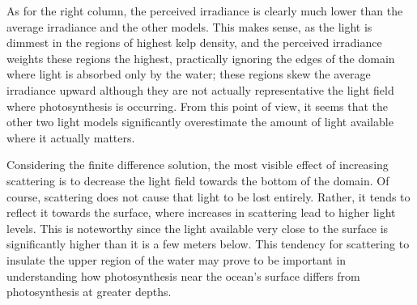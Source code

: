 \documentclass[ms,cpyr,lof,lot]{uathesis}
\providecommand{\DIFadd}[1]{{\protect\color{blue}\uwave{#1}}} %
\providecommand{\DIFaddbegin}{} %
\providecommand{\DIFaddend}{} %
\newcommand{\DIFaddincludegraphics}[2][]{{\color{blue}\fbox{\DIFOincludegraphics[#1]{#2}}}} %
\DeclareRobustCommand{\DIFaddbegin}{\DIFOaddbegin \let\includegraphics\DIFaddincludegraphics} %
\DeclareRobustCommand{\DIFaddend}{\DIFOaddend \let\includegraphics\DIFOincludegraphics} %
\begin{document}
As for the right column, the perceived irradiance is clearly much lower than the average irradiance and the other models.
This makes sense, as the light is dimmest in the regions of highest kelp density, and the perceived irradiance weights these regions the highest, practically ignoring the edges of the domain where light is absorbed only by the water; these regions skew the average irradiance upward although they are not actually representative \DIFaddbegin \DIFadd{of }\DIFaddend the light field where photosynthesis is occurring.
From this point of view, it seems that the other two light models significantly overestimate the amount of light available where it actually matters.

Considering the finite difference solution, the most visible effect of increasing scattering is to decrease the light field towards the bottom of the domain.
Of course, scattering does not cause that light to be lost entirely.
Rather, it tends to reflect it towards the surface, where increases in scattering lead to higher light levels.
This is noteworthy since the light available very close to the surface is significantly higher than it is a few meters below.
This tendency for scattering to insulate the upper region of the water may prove to be important in understanding how photosynthesis near the ocean's surface differs from photosynthesis at greater depths.
\end{document}
